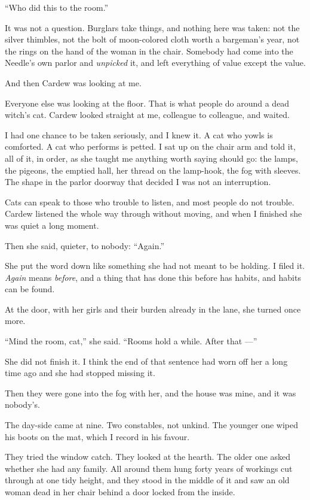 ``Who did this to the room.''

It was not a question. Burglars take things, and nothing here was taken: not the silver thimbles, not the bolt of moon-colored cloth worth a bargeman's year, not the rings on the hand of the woman in the chair. Somebody had come into the Needle's own parlor and \emph{unpicked} it, and left everything of value except the value.

And then Cardew was looking at me.

Everyone else was looking at the floor. That is what people do around a dead witch's cat. Cardew looked straight at me, colleague to colleague, and waited.

I had one chance to be taken seriously, and I knew it. A cat who yowls is comforted. A cat who performs is petted. I sat up on the chair arm and told it, all of it, in order, as she taught me anything worth saying should go: the lamps, the pigeons, the emptied hall, her thread on the lamp-hook, the fog with sleeves. The shape in the parlor doorway that decided I was not an interruption.

Cats can speak to those who trouble to listen, and most people do not trouble. Cardew listened the whole way through without moving, and when I finished she was quiet a long moment.

Then she said, quieter, to nobody: ``Again.''

She put the word down like something she had not meant to be holding. I filed it. \emph{Again} means \emph{before}, and a thing that has done this before has habits, and habits can be found.

At the door, with her girls and their burden already in the lane, she turned once more.

``Mind the room, cat,'' she said. ``Rooms hold a while. After that ---''

She did not finish it. I think the end of that sentence had worn off her a long time ago and she had stopped missing it.

Then they were gone into the fog with her, and the house was mine, and it was nobody's.

\scenebreak

The day-side came at nine. Two constables, not unkind. The younger one wiped his boots on the mat, which I record in his favour.

They tried the window catch. They looked at the hearth. The older one asked whether she had any family. All around them hung forty years of workings cut through at one tidy height, and they stood in the middle of it and saw an old woman dead in her chair behind a door locked from the inside.

